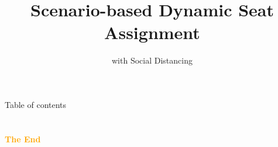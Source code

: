 \documentclass[aspectratio=43]{beamer}
\title{Scenario-based Dynamic Seat Assignment} %
\subtitle{with Social Distancing}
\institute[HKUST]{
    IEDA%
    \\%
    The Hong Kong University of Science and Technology%
} %
\date{}
\begin{document}
    \frame{\titlepage}
    \begin{frame}{Table of contents}
        \tableofcontents
    \end{frame}
    
    
    
    
    

    \section{}
    \begin{frame}{}
        \centering
            \Huge\bfseries
        \textcolor{orange}{The End}
    \end{frame}
\end{document}
